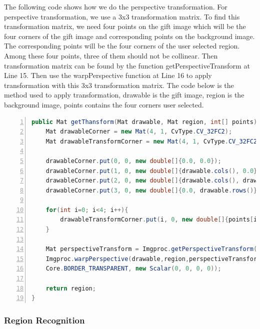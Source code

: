 \par The following code shows how we do the perspective transformation. For perspective transformation, we use a 3x3 transformation matrix. To find this transformation matrix, we need four points on the gift image which will be the four corners of the gift image and corresponding points on the background image. The corresponding points will be the four corners of the user selected region.  Among these four points, three of them should not be collinear. Then transformation matrix can be found by the function getPerspectiveTransform at Line 15. Then use the warpPerspective function at Line 16  to apply transformation with this 3x3 transformation matrix. The code below is the method used to apply transformation, drawable is the gift image, region is the background image, points contains the four corners user selected.

\begin{lstlisting}[language={java},
        numbers=left,basicstyle=\footnotesize\ttfamily,breaklines=true,xleftmargin=.1\textwidth, xrightmargin=.1\textwidth]
public Mat getThansform(Mat drawable, Mat region, int[] points) {
    Mat drawableCorner = new Mat(4, 1, CvType.CV_32FC2);
    Mat drawableTransformCorner = new Mat(4, 1, CvType.CV_32FC2);

    drawableCorner.put(0, 0, new double[]{0.0, 0.0});
    drawableCorner.put(1, 0, new double[]{drawable.cols(), 0.0});
    drawableCorner.put(2, 0, new double[]{drawable.cols(), drawable.rows()});
    drawableCorner.put(3, 0, new double[]{0.0, drawable.rows()});
    
    for(int i=0; i<4; i++){
        drawableTransformCorner.put(i, 0, new double[]{points[i*2], points[i*2+1]});
    }

    Mat perspectiveTransform = Imgproc.getPerspectiveTransform(drawableCorner, drawableTransformCorner);
    Imgproc.warpPerspective(drawable,region,perspectiveTransform, region.size(), Imgproc.INTER_LINEAR,
    Core.BORDER_TRANSPARENT, new Scalar(0, 0, 0, 0));

    return region;
}
\end{lstlisting} 
\subsubsection{Region Recognition}
